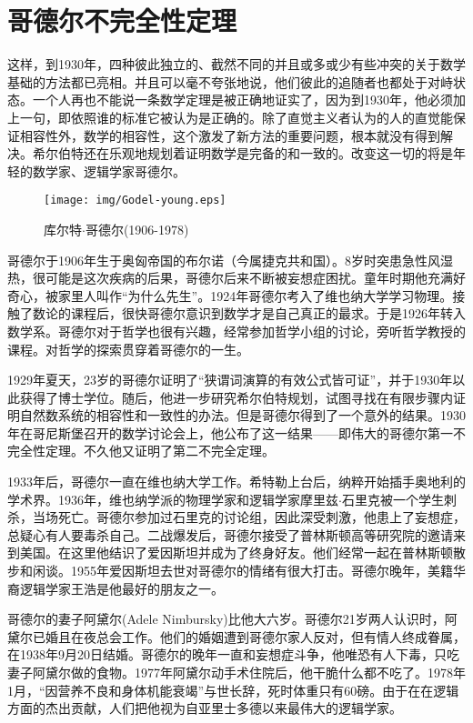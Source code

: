\documentclass{article}
\begin{document}
\section{哥德尔不完全性定理}

这样，到1930年，四种彼此独立的、截然不同的并且或多或少有些冲突的关于数学基础的方法都已亮相。并且可以毫不夸张地说，他们彼此的追随者也都处于对峙状态。一个人再也不能说一条数学定理是被正确地证实了，因为到1930年，他必须加上一句，即依照谁的标准它被认为是正确的。除了直觉主义者认为的人的直觉能保证相容性外，数学的相容性，这个激发了新方法的重要问题，根本就没有得到解决。希尔伯特还在乐观地规划着证明数学是完备的和一致的。改变这一切的将是年轻的数学家、逻辑学家哥德尔。

\begin{wrapfigure}{L}{0.4\textwidth}
 \centering
 \texttt{[image: img/Godel-young.eps]}
 \captionsetup{labelformat=empty}
 \caption{库尔特$\cdot$哥德尔(1906-1978)}
 \label{fig:Godel-young}
\end{wrapfigure}

哥德尔于1906年生于奥匈帝国的布尔诺（今属捷克共和国）。8岁时突患急性风湿热，很可能是这次疾病的后果，哥德尔后来不断被妄想症困扰。童年时期他充满好奇心，被家里人叫作“为什么先生”。1924年哥德尔考入了维也纳大学学习物理。接触了数论的课程后，很快哥德尔意识到数学才是自己真正的最求。于是1926年转入数学系。哥德尔对于哲学也很有兴趣，经常参加哲学小组的讨论，旁听哲学教授的课程。对哲学的探索贯穿着哥德尔的一生。

1929年夏天，23岁的哥德尔证明了“狭谓词演算的有效公式皆可证”，并于1930年以此获得了博士学位。随后，他进一步研究希尔伯特规划，试图寻找在有限步骤内证明自然数系统的相容性和一致性的办法。但是哥德尔得到了一个意外的结果。1930年在哥尼斯堡召开的数学讨论会上，他公布了这一结果——即伟大的哥德尔第一不完全性定理。不久他又证明了第二不完全定理。

1933年后，哥德尔一直在维也纳大学工作。希特勒上台后，纳粹开始插手奥地利的学术界。1936年，维也纳学派的物理学家和逻辑学家摩里兹$\cdot$石里克被一个学生刺杀，当场死亡。哥德尔参加过石里克的讨论组，因此深受刺激，他患上了妄想症，总疑心有人要毒杀自己。二战爆发后，哥德尔接受了普林斯顿高等研究院的邀请来到美国。在这里他结识了爱因斯坦并成为了终身好友。他们经常一起在普林斯顿散步和闲谈。1955年爱因斯坦去世对哥德尔的情绪有很大打击。哥德尔晚年，美籍华裔逻辑学家王浩是他最好的朋友之一。

哥德尔的妻子阿黛尔(Adele Nimbursky)比他大六岁。哥德尔21岁两人认识时，阿黛尔已婚且在夜总会工作。他们的婚姻遭到哥德尔家人反对，但有情人终成眷属，在1938年9月20日结婚。哥德尔的晚年一直和妄想症斗争，他唯恐有人下毒，只吃妻子阿黛尔做的食物。1977年阿黛尔动手术住院后，他干脆什么都不吃了。1978年1月，“因营养不良和身体机能衰竭”与世长辞，死时体重只有60磅。由于在在逻辑方面的杰出贡献，人们把他视为自亚里士多德以来最伟大的逻辑学家。
\end{document}
